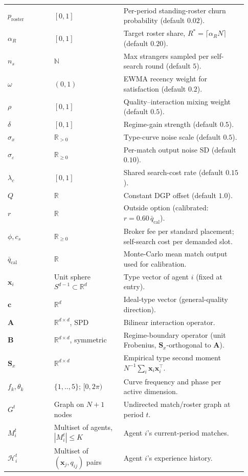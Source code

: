 \documentclass[11pt]{article}
\newcommand{\x}{\mathbf{x}}
\newcommand{\A}{\mathbf{A}}
\newcommand{\Sx}{\mathbf{S}_x}
\newcommand{\Hist}{\mathcal{H}}
\newcommand{\R}{\mathbb{R}}
\newcommand{\Ntot}{N}
\begin{document}
{\begin{longtable}{@{}p{0.18\linewidth}p{0.27\linewidth}p{0.48\linewidth}@{}}
$p_{\text{roster}}$ & $[0,1]$ & Per-period standing-roster churn probability (default $0.02$).\\
$\alpha_R$ & $[0,1]$ & Target roster share, $R^* = \lceil \alpha_R \Ntot\rceil$ (default $0.20$).\\
$n_s$ & $\mathbb{N}$ & Max strangers sampled per self-search round (default $5$).\\
$\omega$ & $(0,1)$ & EWMA recency weight for satisfaction (default $0.2$).\\
$\rho$ & $[0,1]$ & Quality--interaction mixing weight (default $0.5$).\\
$\delta$ & $[0,1]$ & Regime-gain strength (default $0.5$).\\
$\sigma_x$ & $\R_{>0}$ & Type-curve noise scale (default $0.5$).\\
$\sigma_\varepsilon$ & $\R_{\ge 0}$ & Per-match output noise SD (default $0.10$).\\
$\lambda_c$ & $[0,1]$ & Shared search-cost rate (default $0.15$).\\
$Q$ & $\R$ & Constant DGP offset (default $1.0$).\\
$r$ & $\R$ & Outside option (calibrated: $r = 0.60\,\bar q_{\text{cal}}$).\\
$\phi, c_s$ & $\R_{\ge 0}$ & Broker fee per standard placement; self-search cost per demanded slot.\\
$\bar q_{\text{cal}}$ & $\R$ & Monte-Carlo mean match output used for calibration.\\
$\mathbf{x}_i$ & Unit sphere $S^{d-1}\subset\R^{d}$ & Type vector of agent $i$ (fixed at entry).\\
$\mathbf{c}$ & $\R^{d}$ & Ideal-type vector (general-quality direction).\\
$\mathbf{A}$ & $\R^{d\times d}$, SPD & Bilinear interaction operator.\\
$\mathbf{B}$ & $\R^{d\times d}$, symmetric & Regime-boundary operator (unit Frobenius, $\Sx$-orthogonal to $\A$).\\
$\Sx$ & $\R^{d\times d}$ & Empirical type second moment $\Ntot^{-1}\sum_i \x_i\x_i^\top$.\\
$f_k, \theta_k$ & $\{1,..,5\}$; $[0,2\pi)$ & Curve frequency and phase per active dimension.\\
$G^t$ & Graph on $\Ntot{+}1$ nodes & Undirected match/roster graph at period $t$.\\
$M_i^t$ & Multiset of agents, $|M_i^t|\le K$ & Agent $i$'s current-period matches.\\
$\Hist_i^t$ & Multiset of $(\x_j,q_{ij})$ pairs & Agent $i$'s experience history.\\

\end{longtable}}
\end{document}
